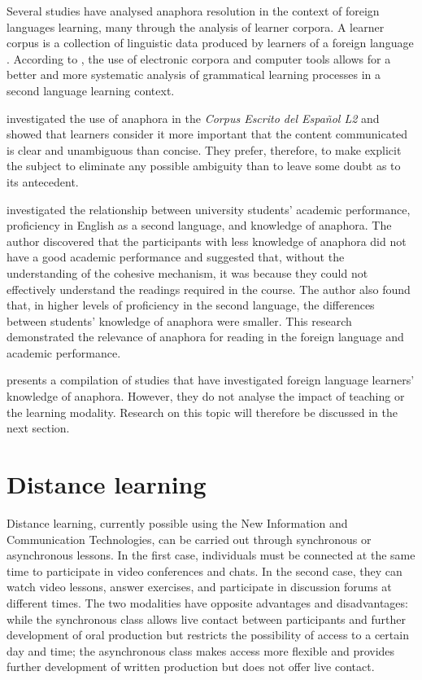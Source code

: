 \documentclass{textolivre}
\begin{document}
Several studies have analysed anaphora resolution in the context of
foreign languages learning, many through the analysis of learner
corpora. A learner corpus is a collection of linguistic data
produced by learners of a foreign language \cite[p.~65]{mcenery_corpus_2006}.
According to \textcite[p.~288]{mitchell_second_2013}, the
use of electronic corpora and computer tools allows for a better
and more systematic analysis of grammatical learning processes in a
second language learning context.

\textcite{lozano_2016} investigated the use of anaphora in the \emph{Corpus
Escrito del Español L2} and showed that learners consider it more
important that the content communicated is clear and unambiguous than
concise. They prefer, therefore, to make explicit the subject to
eliminate any possible ambiguity than to leave some doubt as to its
antecedent.

\textcite{pretorius_english_2005} investigated the relationship between university
students' academic performance, proficiency in English as a second
language, and knowledge of anaphora. The author discovered that the
participants with less knowledge of anaphora did not have a good
academic performance and suggested that, without the understanding of
the cohesive mechanism, it was because they could not effectively
understand the readings required in the course. The author also found
that, in higher levels of proficiency in the second language, the
differences between students' knowledge of anaphora were smaller. This
research demonstrated the relevance of anaphora for reading in the
foreign language and academic performance.

\textcite[p.~608-9]{ellis_study_2008} presents a compilation of studies that have
investigated foreign language learners' knowledge of anaphora. However,
they do not analyse the impact of teaching or the learning modality.
Research on this topic will therefore be discussed in the next section.


\section{Distance learning}\label{sec-dist-learn}
Distance learning, currently possible using the New Information and
Communication Technologies, can be carried out through synchronous or
asynchronous lessons. In the first case, individuals must be connected
at the same time to participate in video conferences and chats. In the
second case, they can watch video lessons, answer exercises, and
participate in discussion forums at different times. The two modalities
have opposite advantages and disadvantages: while the synchronous class
allows live contact between participants and further development of oral
production but restricts the possibility of access to a certain day and
time; the asynchronous class makes access more flexible and provides
further development of written production but does not offer live
contact.
\end{document}
